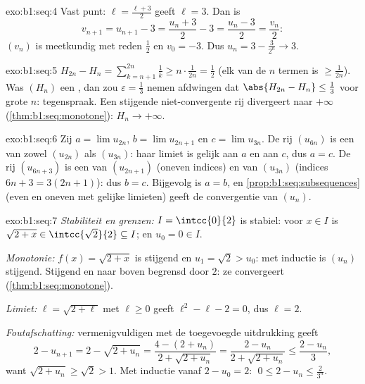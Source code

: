 \begin{solution}{exo:b1:seq:4}
Vast punt: $\ell = \frac{\ell + 3}{2}$ geeft $\ell = 3$. Dan is
\[
v_{n+1} = u_{n+1} - 3 = \frac{u_n + 3}{2} - 3 = \frac{u_n - 3}{2} =
\frac{v_n}{2}:
\]
$(v_n)$ is meetkundig met reden $\frac12$ en $v_0 = -3$. Dus $u_n = 3 -
\frac{3}{2^n} \to 3$.
\end{solution}

\begin{solution}{exo:b1:seq:5}
$H_{2n} - H_n = \sum_{k=n+1}^{2n} \frac 1k \geq n \cdot \frac{1}{2n} =
\frac12$ (elk van de $n$ termen is $\geq \frac{1}{2n}$). Was $(H_n)$ een
, dan zou $\varepsilon = \frac13$ nemen afdwingen dat
$\abs{H_{2n} - H_n} \leq \frac13$ voor grote $n$: tegenspraak. Een
stijgende niet-convergente rij divergeert naar $+\infty$
(\cref{thm:b1:seq:monotone}): $H_n \to +\infty$.
\end{solution}

\begin{solution}{exo:b1:seq:6}
Zij $a = \lim u_{2n}$, $b = \lim u_{2n+1}$ en $c = \lim u_{3n}$. De rij
$(u_{6n})$ is een  van zowel $(u_{2n})$ als $(u_{3n})$: haar
limiet is gelijk aan $a$ en aan $c$, dus $a = c$. De rij $(u_{6n+3})$ is
een  van $(u_{2n+1})$ (oneven indices) en van $(u_{3n})$ (indices
$6n + 3 = 3(2n+1)$): dus $b = c$. Bijgevolg is $a = b$, en
\cref{prop:b1:seq:subsequences} (even en oneven met gelijke limieten)
geeft de convergentie van $(u_n)$.
\end{solution}

\begin{solution}{exo:b1:seq:7}
\emph{Stabiliteit en grenzen:} $I = \intcc{0}{2}$ is stabiel: voor $x \in
I$ is $\sqrt{2 + x} \in \intcc{\sqrt 2}{2} \subseteq I$; en $u_0 = 0 \in
I$.

\emph{Monotonie:} $f(x) = \sqrt{2+x}$ is stijgend en $u_1 = \sqrt 2 >
u_0$: met inductie is $(u_n)$ stijgend. Stijgend en naar boven begrensd
door $2$: ze convergeert (\cref{thm:b1:seq:monotone}).

\emph{Limiet:} $\ell = \sqrt{2 + \ell}$ met $\ell \geq 0$ geeft $\ell^2 -
\ell - 2 = 0$, dus $\ell = 2$.

\emph{Foutafschatting:} vermenigvuldigen met de toegevoegde uitdrukking
geeft
\[
2 - u_{n+1} = 2 - \sqrt{2 + u_n}
= \frac{4 - (2 + u_n)}{2 + \sqrt{2+u_n}}
= \frac{2 - u_n}{2 + \sqrt{2 + u_n}}
\leq \frac{2 - u_n}{3},
\]
want $\sqrt{2 + u_n} \geq \sqrt 2 > 1$. Met inductie vanaf $2 - u_0 = 2$:
$\;0 \leq 2 - u_n \leq \frac{2}{3^n}$.
\end{solution}

